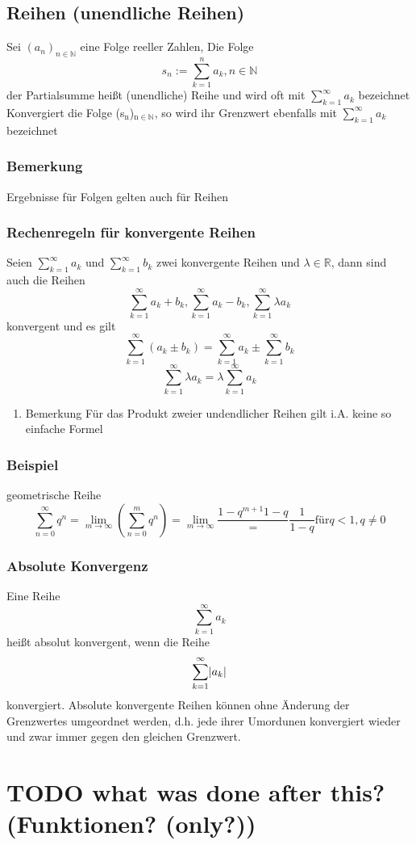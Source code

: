 \documentclass[11pt]{article}
\DeclarePairedDelimiter\abs{\lvert}{\rvert}%
\begin{document}
\subsection{Reihen (unendliche Reihen)}
\label{sec-3-2}
Sei $(a_n)_{n\in\mathbb{N}}$ eine Folge reeller Zahlen, Die Folge \[s_n := \sum_{k=1}^n a_k, n\in\mathbb{N}\] der Partialsumme heißt (unendliche) Reihe und wird oft mit $\sum_{k=1}^\infty a_k$ bezeichnet
Konvergiert die Folge (s$_{\text{n}}$)$_{\text{n}\in\mathbb{N}}$, so wird ihr Grenzwert ebenfalls mit $\sum_{k=1}^\infty a_k$ bezeichnet
\subsubsection{Bemerkung}
\label{sec-3-2-1}
Ergebnisse für Folgen gelten auch für Reihen
\subsubsection{Rechenregeln für konvergente Reihen}
\label{sec-3-2-2}
Seien $\sum_{k=1}^\infty a_k$ und $\sum_{k=1}^\infty b_k$ zwei konvergente Reihen und $\lambda\in\mathbb{R}$, dann sind auch die Reihen \[\sum_{k=1}^\infty a_k + b_k, \sum_{k=1}^\infty a_k - b_k, \sum_{k=1}^\infty \lambda a_k\] konvergent und es gilt
\[\sum_{k=1}^\infty(a_k \pm b_k) = \sum_{k=1}^\infty a_k \pm \sum_{k=1}^\infty b_k\]
\[\sum_{k=1}^\infty \lambda a_k = \lambda \sum_{k=1}^\infty a_k\]
\begin{enumerate}
\item Bemerkung
\label{sec-3-2-2-1}
Für das Produkt zweier undendlicher Reihen gilt i.A. keine so einfache Formel
\end{enumerate}
\subsubsection{Beispiel}
\label{sec-3-2-3}
geometrische Reihe \[\sum_{n=0}^\infty q^n = \lim_{m\to\infty}(\sum_{n=0}^m q^n) = \lim_{m\to\infty}\frac{1-q^{m+1}{1-q}} = \frac{1}{1-q} \text{für} q < 1, q\neq 0\]
\subsubsection{Absolute Konvergenz}
\label{sec-3-2-4}
Eine Reihe \[\sum_{k=1}^\infty a_k\] heißt absolut konvergent, wenn die Reihe \[\sum_{k=1}^\infty\abs{a_k}\] konvergiert. Absolute konvergente Reihen können ohne Änderung der Grenzwertes umgeordnet werden, d.h. jede ihrer Umordunen konvergiert wieder und zwar immer gegen den gleichen Grenzwert.
\section{{\bfseries\sffamily TODO} what was done after this? (Funktionen? (only?))}
\label{sec-4}
\end{document}
